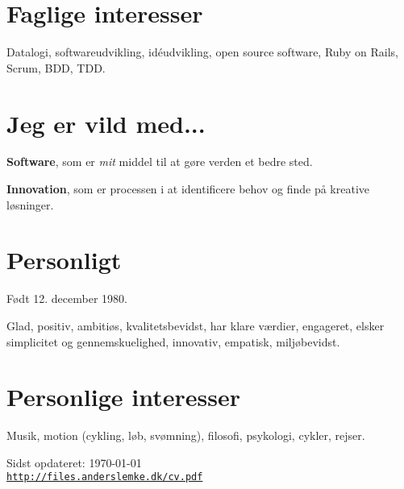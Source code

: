 \documentclass[a4paper]{article}
\renewenvironment{itemize}{
  \begin{list}{}
    { \setlength{\itemsep}{5pt}
      \setlength{\parsep}{0pt}
      \setlength{\topsep}{0pt}
      \setlength{\leftmargin}{0em} } }{
  \end{list}}
\begin{document}
\section*{Faglige interesser}

Datalogi, softwareudvikling, idéudvikling, open source software, Ruby on Rails, Scrum, BDD, TDD.

\section*{Jeg er vild med...}

\begin{itemize}
  \item \textbf{Software}, som er \emph{mit} middel til at gøre verden et bedre sted.
  \item \textbf{Innovation}, som er processen i at identificere behov og finde på kreative løsninger.
\end{itemize}

\section*{Personligt}
Født 12. december 1980.

Glad, positiv, ambitiøs, kvalitetsbevidst, har klare værdier, engageret, elsker simplicitet og gennemskuelighed, innovativ, empatisk, miljøbevidst.


\section*{Personlige interesser} 

Musik, motion (cykling, løb, svømning), filosofi, psykologi, cykler, rejser.

\bigskip

\begin{center}
\begin{footnotesize}
Sidst opdateret: \today \\
\href{http://files.anderslemke.dk/cv.pdf}{\tt http://files.anderslemke.dk/cv.pdf}
\end{footnotesize}
\end{center}
\end{document}
